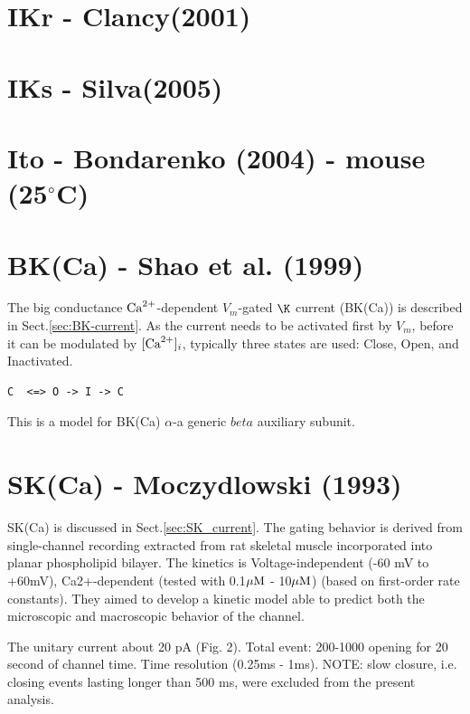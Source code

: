 \section{IKr - Clancy(2001)}

\citep{clancy2001}

\section{IKs - Silva(2005)}

\citep{silva2005} 
 
 \section{Ito - Bondarenko (2004) - mouse (25$^\circ$C)}
 
 \citep{bondarenko2004cma}
 
 \section{BK(Ca) - Shao et al. (1999)}
 
 The big conductance ${\text{Ca}^{2+}}$-dependent $V_m$-gated $\K$ current (BK(Ca)) is
 described in Sect.\ref{sec:BK-current}.
 As the current needs to be activated first by $V_m$, before it can be modulated
 by $[{\text{Ca}^{2+}}]_i$, typically three states are used: Close, Open, and Inactivated.
\begin{verbatim}
C  <=> O -> I -> C
\end{verbatim}
This is a model for BK(Ca) $\alpha$-a generic $beta$ auxiliary subunit.

\section{SK(Ca) - Moczydlowski (1993)}
\label{sec:SK(Ca)-Moczydlowski-1993}

SK(Ca) is discussed in Sect.\ref{sec:SK_current}.
The gating behavior is derived from single-channel recording extracted from rat
skeletal muscle incorporated into planar phospholipid bilayer.
The kinetics is Voltage-independent (-60 mV to +60mV), Ca2+-dependent (tested
with 0.1${\mu\text{M}}$ - 10${\mu\text{M}}$) (based on first-order rate constants).
They aimed to develop a kinetic model able to predict both the microscopic and
macroscopic behavior of the channel.

The unitary current about 20 pA (Fig. 2).
Total event: 200-1000 opening for 20 second of channel time.
Time resolution (0.25ms - 1ms). NOTE: slow closure, i.e. closing events lasting
longer than 500 ms, were excluded from the present analysis.

